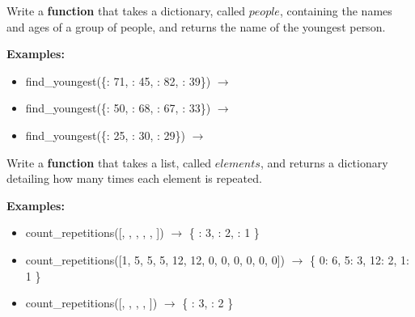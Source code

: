 	\item 	
		Write a \textbf{function} that takes a dictionary, called $people$, containing the names and ages of a group of people, 
		and returns the name of the youngest person.

		\textbf{Examples:}		
		\begin{itemize}
			\item  find\_youngest(\{: 71, : 45, : 82, : 39\}) $\rightarrow$ 
			\item  find\_youngest(\{: 50, : 68, : 67, : 33\}) $\rightarrow$ 
			\item  find\_youngest(\{: 25, : 30, : 29\}) $\rightarrow$ 
		\end{itemize}



	\item 	
		Write a \textbf{function} that takes a list, called $elements$, and returns a dictionary detailing how many times each element is repeated.
		
		\textbf{Examples:}  
		\begin{itemize}  
			\item count\_repetitions([, , , \csq{cow}, , ]) $\rightarrow$ \{ : 3, : 2, : 1 \}
			\item count\_repetitions([1, 5, 5, 5, 12, 12, 0, 0, 0, 0, 0, 0]) $\rightarrow$ \{ 0: 6, 5: 3, 12: 2, 1: 1 \}
			\item count\_repetitions([, , , \csq{null}, ]) $\rightarrow$ \{ : 3, : 2 \}
		\end{itemize} 



